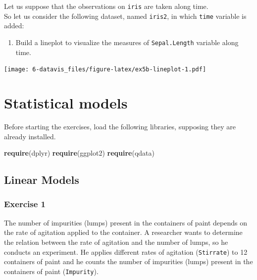 \documentclass[]{book}
\newenvironment{Shaded}{\begin{snugshade}}{\end{snugshade}}
\newcommand{\KeywordTok}[1]{\textcolor[rgb]{0.13,0.29,0.53}{\textbf{{#1}}}}
\newcommand{\DataTypeTok}[1]{\textcolor[rgb]{0.13,0.29,0.53}{{#1}}}
\newcommand{\DecValTok}[1]{\textcolor[rgb]{0.00,0.00,0.81}{{#1}}}
\newcommand{\StringTok}[1]{\textcolor[rgb]{0.31,0.60,0.02}{{#1}}}
\newcommand{\NormalTok}[1]{{#1}}
\providecommand{\tightlist}{%
  \setlength{\itemsep}{0pt}\setlength{\parskip}{0pt}}
\def\tightlist{}
\begin{document}
Let us suppose that the observations on \texttt{iris} are taken along
time.\\
So let us consider the following dataset, named \texttt{iris2}, in which
\texttt{time} variable is added:

\begin{Shaded}
\end{Shaded}

\begin{enumerate}
\def\labelenumi{\alph{enumi}.}
\tightlist
\item
  Build a lineplot to visualize the measures of \texttt{Sepal.Length}
  variable along time.
\end{enumerate}

\texttt{[image: 6-datavis\_files/figure-latex/ex5b-lineplot-1.pdf]}

\chapter{Statistical models}\label{statistical-models}

Before starting the exercises, load the following libraries, supposing
they are already installed.

\begin{Shaded}
\begin{Highlighting}[]
\KeywordTok{require}\NormalTok{(dplyr)}
\KeywordTok{require}\NormalTok{(ggplot2)}
\KeywordTok{require}\NormalTok{(qdata)}
\end{Highlighting}
\end{Shaded}

\section{Linear Models}\label{linear-models}

\subsection{Exercise 1}\label{exercise-1-18}

The number of impurities (lumps) present in the containers of paint
depends on the rate of agitation applied to the container. A researcher
wants to determine the relation between the rate of agitation and the
number of lumps, so he conducts an experiment. He applies different
rates of agitation (\texttt{Stirrate}) to 12 containers of paint and he
counts the number of impurities (lumps) present in the containers of
paint (\texttt{Impurity}).
\end{document}

